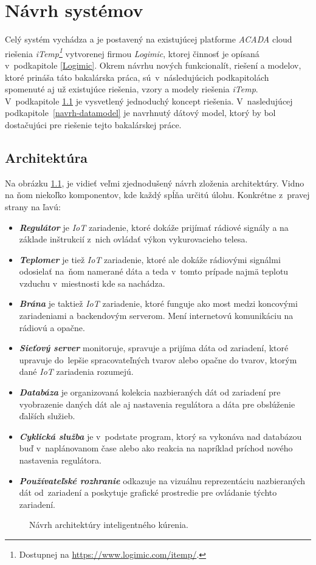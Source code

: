 \chapter{Návrh systémov}\label{navrh}
Celý systém vychádza a je postavený na existujúcej platforme \emph{ACADA} cloud riešenia \emph{iTemp\footnote{Dostupnej na \url{https://www.logimic.com/itemp/}.}} vytvorenej firmou \emph{Logimic}, ktorej činnosť je opísaná v~podkapitole \ref{Logimic}.
Okrem návrhu nových funkcionalít, riešení a modelov, ktoré prináša táto bakalárska práca, sú~v~následujúcich podkapitolách spomenuté aj už existujúce riešenia, vzory a modely riešenia \emph{iTemp}. 
V~podkapitole \ref{navrh-architektura} je vysvetlený jednoduchý koncept riešenia. 
V~nasledujúcej podkapitole~\ref{navrh-datamodel} je navrhnutý dátový model, ktorý by bol dostačujúci pre riešenie tejto bakalárskej práce.


\section{Architektúra}\label{navrh-architektura}
Na obrázku \ref{fig:designedArch}, je vidieť veľmi zjednodušený návrh zloženia architektúry. Vidno na ňom niekoľko komponentov, kde každý spĺňa určitú úlohu. Konkrétne z~pravej strany na ľavú:\begin{itemize}
    \item \textbf{\emph{Regulátor}} je \emph{IoT} zariadenie, ktoré dokáže prijímať rádiové signály a na základe inštrukcií z~nich ovládať výkon vykurovacieho telesa.
    \item \textbf{\emph{Teplomer}} je tiež \emph{IoT} zariadenie, ktoré ale dokáže rádiovými signálmi odosielať na~ňom namerané dáta a teda v~tomto prípade najmä teplotu vzduchu v~miestnosti kde sa nachádza.
    \item \textbf{\emph{Brána}} je taktiež \emph{IoT} zariadenie, ktoré funguje ako most medzi koncovými zariadeniami a backendovým serverom. Mení internetovú komunikáciu na rádiovú a opačne.
    \item \textbf{\emph{Sieťový server}} monitoruje, spravuje a prijíma dáta od zariadení, ktoré upravuje do~lepšie spracovateľných tvarov alebo opačne do tvarov, ktorým dané \emph{IoT} zariadenia rozumejú.
    \item \textbf{\emph{Databáza}} je organizovaná kolekcia nazbieraných dát od zariadení pre vyobrazenie daných dát ale aj nastavenia regulátora a dáta pre obslúženie ďalších služieb.
    \item \textbf{\emph{Cyklická služba}} je v~podstate program, ktorý sa vykonáva nad databázou buď v~naplánovanom čase alebo ako reakcia na napríklad príchod nového nastavenia regulátora. 
    \item \textbf{\emph{Používateľské rozhranie}} odkazuje na vizuálnu reprezentáciu nazbieraných dát od~zariadení a poskytuje grafické prostredie pre ovládanie týchto zariadení.
\end{itemize}
\begin{figure}[h!]
    \centering
    
    \caption{Návrh architektúry inteligentného kúrenia.}
    \label{fig:designedArch}
\end{figure}
